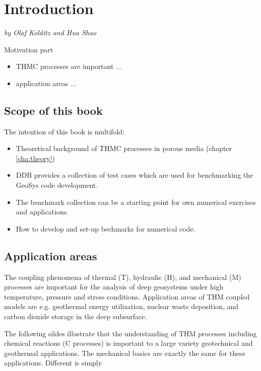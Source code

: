 \chapter{Introduction}
\textit{by Olaf Kolditz and Hua Shao}

Motivation part
\begin{itemize}
  \item THMC processes are important ...
  \item application areas ...
\end{itemize}

\section{Scope of this book}

The intention of this book is multifold:
\begin{itemize}
  \item Theoretical background of THMC processes in porous media (chapter \ref{cha:theory})
  \item DDB provides a collection of test cases which are used for benchmarking the GeoSys code development.
  \item The benchmark collection can be a starting point for own numerical exercises and applications.
  \item How to develop and set-up bechmarks for numerical code.
\end{itemize}

\section{Application areas}

The coupling phenomena of thermal (T), hydraulic (H), and mechanical (M) processes are important for the analysis of deep geosystems under high temperature, pressure and stress conditions. Application areas of THM coupled models are e.g. geothermal energy utilization, nuclear waste deposition, and carbon dioxide storage in the deep subsurface.

The following sildes illustrate that the understanding of THM processes including chemical reactions (C processes) is important to a large variety geotechnical and geothermal applications. The mechanical basics are exactly the same for these applications. Different is simply

